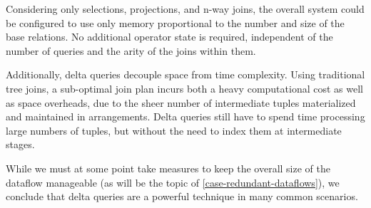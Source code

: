 \documentclass[../catalog.tex]{subfiles}
\begin{document}
Considering only selections, projections, and n-way joins, the overall
system could be configured to use only memory proportional to the
number and size of the base relations. No additional operator state is
required, independent of the number of queries and the arity of the
joins within them.

Additionally, delta queries decouple space from time complexity. Using
traditional tree joins, a sub-optimal join plan incurs both a heavy
computational cost as well as space overheads, due to the sheer number
of intermediate tuples materialized and maintained in
arrangements. Delta queries still have to spend time processing large
numbers of tuples, but without the need to index them at intermediate
stages.

While we must at some point take measures to keep the overall size of
the dataflow manageable (as will be the topic of
\autoref{case-redundant-dataflows}), we conclude that delta queries
are a powerful technique in many common scenarios.
\end{document}
